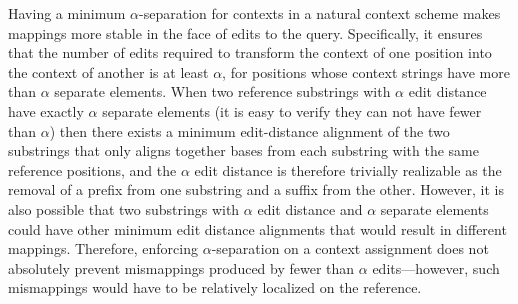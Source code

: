 Having a minimum $\alpha$-separation for contexts in a natural context scheme makes mappings more stable in the face of edits to the query. Specifically, it ensures that the number of edits required to transform the context of one position into the context of another is at least $\alpha$, for positions whose context strings have more than $\alpha$ separate elements. %
When two reference substrings with $\alpha$ edit distance have exactly $\alpha$ separate elements (it is easy to verify they can not have fewer than $\alpha$) then there exists a minimum edit-distance alignment of the two substrings that only aligns together bases from each substring with the same reference positions, and the $\alpha$ edit distance is therefore trivially realizable as the removal of a prefix from one substring and a suffix from the other. However, it is also possible that two substrings with $\alpha$ edit distance and $\alpha$ separate elements could have other minimum edit distance alignments that would result in different mappings. Therefore, enforcing $\alpha$-separation on a context assignment does not absolutely prevent mismappings produced by fewer than $\alpha$ edits---however, such mismappings would have to be relatively localized on the reference. 






